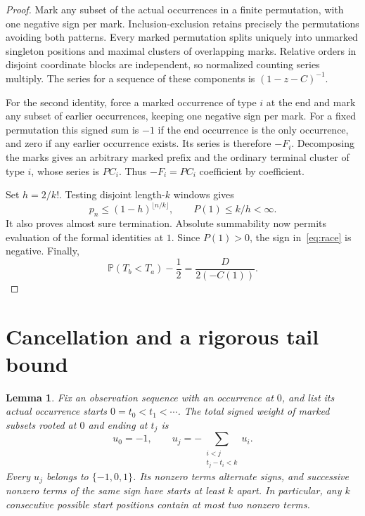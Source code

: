 \documentclass[11pt]{amsart}
\newtheorem{lemma}[theorem]{Lemma}
\theoremstyle{remark}
\newcommand{\Prb}{\mathbb P}
\begin{document}
\begin{proof}
Mark any subset of the actual occurrences in a finite permutation, with one negative sign per mark. Inclusion-exclusion retains precisely the permutations avoiding both patterns. Every marked permutation splits uniquely into unmarked singleton positions and maximal clusters of overlapping marks. Relative orders in disjoint coordinate blocks are independent, so normalized counting series multiply. The series for a sequence of these components is $(1-z-C)^{-1}$.

For the second identity, force a marked occurrence of type $i$ at the end and mark any subset of earlier occurrences, keeping one negative sign per mark. For a fixed permutation this signed sum is $-1$ if the end occurrence is the only occurrence, and zero if any earlier occurrence exists. Its series is therefore $-F_i$. Decomposing the marks gives an arbitrary marked prefix and the ordinary terminal cluster of type $i$, whose series is $PC_i$. Thus $-F_i=PC_i$ coefficient by coefficient.

Set $h=2/k!$. Testing disjoint length-$k$ windows gives
\[
 p_n\le(1-h)^{\lfloor n/k\rfloor},\qquad P(1)\le k/h<\infty.
\]
It also proves almost sure termination. Absolute summability now permits evaluation of the formal identities at $1$. Since $P(1)>0$, the sign in~\eqref{eq:race} is negative. Finally,
\[
 \Prb(T_b<T_a)-\frac12=\frac{D}{2(-C(1))}.
\]
\end{proof}

\section{Cancellation and a rigorous tail bound}

\begin{lemma}\label{lem:cancel}
Fix an observation sequence with an occurrence at $0$, and list its actual occurrence starts $0=t_0<t_1<\cdots$. The total signed weight of marked subsets rooted at $0$ and ending at $t_j$ is
\begin{equation}\label{eq:cancel}
 u_0=-1,\qquad u_j=-\sum_{\substack{i<j\\t_j-t_i<k}}u_i.
\end{equation}
Every $u_j$ belongs to $\{-1,0,1\}$. Its nonzero terms alternate signs, and successive nonzero terms of the same sign have starts at least $k$ apart. In particular, any $k$ consecutive possible start positions contain at most two nonzero terms.
\end{lemma}
\end{document}
